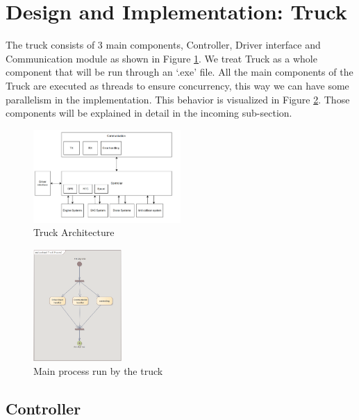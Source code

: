 \section{Design and Implementation: Truck}
\label{sec:design and implementation_truck} 

The truck consists of 3 main components, Controller, Driver interface and Communication module as shown in Figure \ref{img:truck_architecture}. We treat Truck as a whole component that will be run through an ‘.exe’ file. All the main components of the Truck are executed as threads to ensure concurrency, this way we can have some parallelism in the implementation. This behavior is visualized in Figure \ref{img:truck_activity}. Those components will be explained in detail in the incoming sub-section.
  
\begin{figure}[ht]
    \centering
    \includegraphics[width=0.5\textwidth]{images/truck_architecture.png}
    \caption{Truck Architecture}
    \label{img:truck_architecture}
\end{figure}

\begin{figure}[ht]
    \centering
    \includegraphics[width=0.3\textwidth]{images/truck_activity.png}
    \caption{Main process run by the truck}
    \label{img:truck_activity}
\end{figure}

\subsection{Controller}
\label{subsec:controller} 

